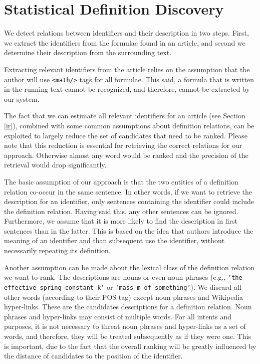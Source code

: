\documentclass[runningheads]{llncs}
\begin{document}
\section{Statistical Definition Discovery}

We detect relations between identifiers and their description in two steps.
First, we extract the identifiers from the formulae found in an article, and
second we determine their description from the surrounding text.

Extracting relevant identifiers from the article relies on the assumption that
the author will use \texttt{<math/>} tags for all formulae. This said, a
formula that is written in the running text cannot be recognized, and therefore,
cannot be extracted by our system.

The fact that we can estimate all relevant identifiers for an article (see
Section \ref{ir}), combined with some common assumptions about definition relations,
can be exploited to largely reduce the set of candidates that need to be
ranked. Please note that this reduction is essential for retrieving the
correct relations for our approach. Otherwise almost any word would be ranked
and the precision of the retrieval would drop significantly.

The basic assumption of our approach is that the two entities of a definition
relation co-occur in the same sentence. In other words, if we want to retrieve
the description for an identifier, only sentences containing the identifier
could include the definition relation. Having said this, any other sentences can
be ignored. Furthermore, we assume that it is more likely to find the
description in first sentences than in the latter. This is based on the idea
that authors introduce the meaning of an identifier and than subsequent use the
identifier, without necessarily repeating its definition.

Another assumption can be made about the lexical class of the definition relation we
want to rank. The descriptions are nouns or even noun phrases (e.g., \texttt{`the
effective spring constant k'} or \texttt{`mass m of something'}). We discard
all other words (according to their POS tag) except noun phrases and Wikipedia
hyper-links. These are the candidates descriptions for a definition relation. Noun phrases
and hyper-links may consist of multiple words. For all intents and purposes, it
is not necessary to threat noun phrases and hyper-links as a set of words, and
therefore, they will be treated subsequently as if they were one. This is
important, due to the fact that the overall ranking will be greatly influenced
by the distance of candidates to the position of the identifier.
\end{document}
